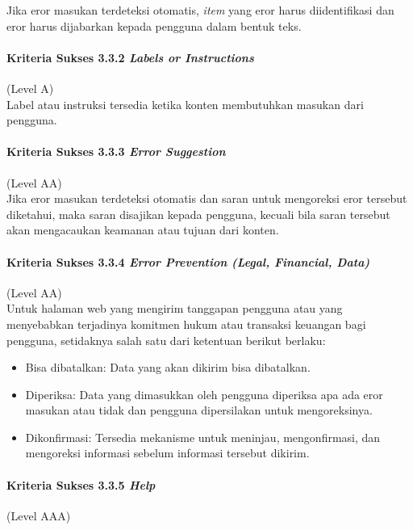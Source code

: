 Jika eror masukan terdeteksi otomatis, \textit{item} yang eror harus diidentifikasi dan eror harus dijabarkan kepada pengguna dalam bentuk teks.

\paragraph{Kriteria Sukses 3.3.2 \textit{Labels or Instructions}}
\label{sec:kriteria_sukses_3.3.2}
(Level A)\\

Label atau instruksi tersedia ketika konten membutuhkan masukan dari pengguna.

\paragraph{Kriteria Sukses 3.3.3 \textit{Error Suggestion}}
\label{sec:kriteria_sukses_3.3.3}
(Level AA)\\

Jika eror masukan terdeteksi otomatis dan saran untuk mengoreksi eror tersebut diketahui, maka saran disajikan kepada pengguna, kecuali bila saran tersebut akan mengacaukan keamanan atau tujuan dari konten.

\paragraph{Kriteria Sukses 3.3.4 \textit{Error Prevention (Legal, Financial, Data)\\}}
\label{sec:kriteria_sukses_3.3.4}
(Level AA)\\

Untuk halaman web yang mengirim tanggapan pengguna atau yang menyebabkan terjadinya komitmen hukum atau transaksi keuangan bagi pengguna, setidaknya salah satu dari ketentuan berikut berlaku:
\begin{itemize}
	\item Bisa dibatalkan: Data yang akan dikirim bisa dibatalkan.
	\item Diperiksa: Data yang dimasukkan oleh pengguna diperiksa apa ada eror masukan atau tidak dan pengguna dipersilakan untuk mengoreksinya.
	\item Dikonfirmasi: Tersedia mekanisme untuk meninjau, mengonfirmasi, dan mengoreksi informasi sebelum informasi tersebut dikirim.
\end{itemize}

\paragraph{Kriteria Sukses 3.3.5 \textit{Help}}
\label{sec:kriteria_sukses_3.3.5}
(Level AAA)\\

